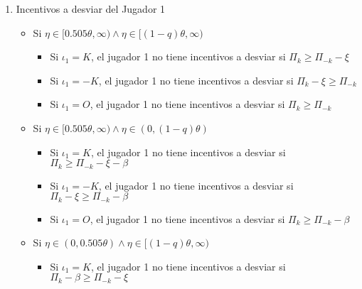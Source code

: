 {\begin{enumerate}
\begin{enumerate}
\begin{enumerate}
\begin{itemize}
                La mejor respuesta del jugador 2 si recibe un señal $E_{-k}$ es:
                \begin{equation*}
                \gamma_2(E_{-k})=
                \begin{cases}
                    I \text{ si } \eta \geq (1-q)\theta \\
                    NI \text{ si } \eta < (1-q)\theta \\
                \end{cases}    
                \end{equation*}
        \end{itemize}
        \end{enumerate}
        \item Incentivos a desviar del Jugador 1
        \begin{itemize}
        \item Si $\eta \in [0.505\theta,\infty) \wedge \eta \in [(1-q)\theta,\infty)$
            \begin{itemize}
                \item Si $ \iota_1=K  $, el jugador 1 no tiene incentivos a desviar si $ \Pi_k \geq \Pi_{-k} - \xi $
                \item Si $ \iota_1=-K $, el jugador 1 no tiene incentivos a desviar si $ \Pi_k - \xi \geq \Pi_{-k} $
                \item Si $ \iota_1=O  $, el jugador 1 no tiene incentivos a desviar si $ \Pi_k \geq \Pi_{-k} $
            \end{itemize}
        \item Si $\eta \in [0.505\theta,\infty) \wedge \eta \in (0,(1-q)\theta)$
            \begin{itemize}
                \item Si $ \iota_1=K  $, el jugador 1 no tiene incentivos a desviar si $ \Pi_k \geq \Pi_{-k} - \xi - \beta $
                \item Si $ \iota_1=-K $, el jugador 1 no tiene incentivos a desviar si $ \Pi_k - \xi \geq \Pi_{-k} - \beta $
                \item Si $ \iota_1=O  $, el jugador 1 no tiene incentivos a desviar si $ \Pi_k \geq \Pi_{-k} - \beta $
            \end{itemize}
        \item Si $\eta \in (0,0.505\theta) \wedge \eta \in [(1-q)\theta,\infty)$
            \begin{itemize}
                \item Si $ \iota_1=K  $, el jugador 1 no tiene incentivos a desviar si $ \Pi_k - \beta \geq \Pi_{-k} - \xi $

\end{itemize}
\end{itemize}
\end{enumerate}
\end{enumerate}}
